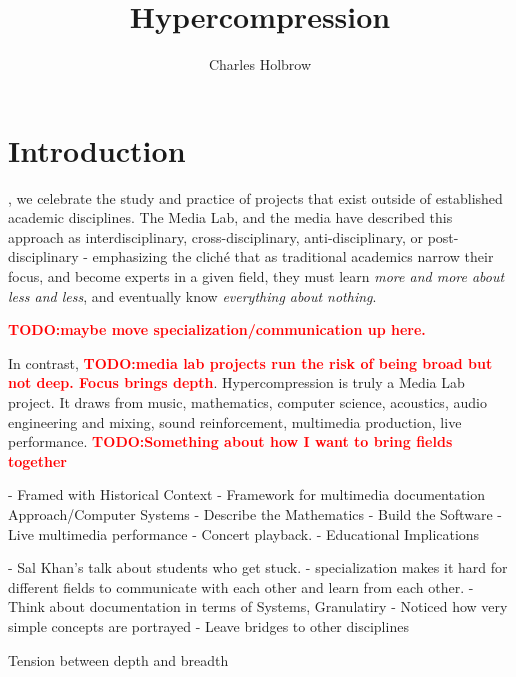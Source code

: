 \documentclass{tufte-book}
\title{Hypercompression}
\author{Charles Holbrow}
\newcommand{\TODO}[1]{\textcolor{red}{\bf TODO:#1}\xspace}
\newcommand{\thesis}{Hypercompression\xspace}
\begin{document}
\frontmatter

\maketitle

\tableofcontents

\mainmatter

\cleardoublepage
\chapter{Introduction}
\label{ch:introduction}

\begin{fullwidth}
  , we celebrate the study and practice
  of projects that exist outside of established academic
  disciplines. The Media Lab, and the media have described this
  approach as interdisciplinary, cross-disciplinary,
  anti-disciplinary, or post-disciplinary - emphasizing the clich\'{e}
  that as traditional academics narrow their focus, and become experts
  in a given field, they must learn \textit{more and more about less
    and less}, and eventually know \textit{everything about
    nothing}.

  \TODO{maybe move specialization/communication up here.}

  In contrast, \TODO{media lab projects run the risk of being broad
    but not deep. Focus brings depth}. \thesis is truly a Media Lab project. It draws from music,
  mathematics, computer science, acoustics, audio engineering and mixing,
  sound reinforcement, multimedia production, live
  performance. \TODO{Something about how I want to bring fields together}

  - Framed with Historical Context
  - Framework for multimedia documentation Approach/Computer Systems
  - Describe the Mathematics 
  - Build the Software
  - Live multimedia performance
  - Concert playback. 
  - Educational Implications

  - Sal Khan's talk about students who get stuck. 
  - specialization makes it hard for different fields to communicate
  with each other and learn from each other. 
  - Think about documentation in terms of Systems, Granulatiry
  - Noticed how very simple concepts are portrayed 
  - Leave bridges to other disciplines 
  

Tension between depth and breadth
\end{fullwidth}
\end{document}
